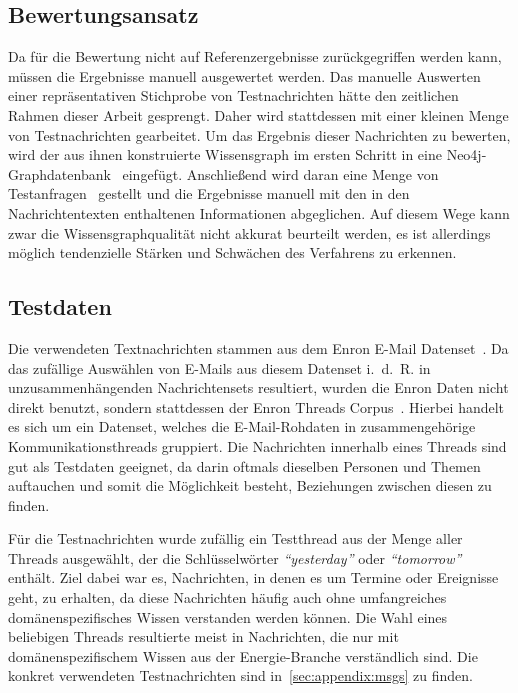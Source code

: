\subsection{Bewertungsansatz}%
\label{sec:evaluation:quality:method}

Da für die Bewertung nicht auf Referenzergebnisse zurückgegriffen werden kann, müssen die Ergebnisse manuell ausgewertet werden.
Das manuelle Auswerten einer repräsentativen Stichprobe von Testnachrichten hätte den zeitlichen Rahmen dieser Arbeit gesprengt.
Daher wird stattdessen mit einer kleinen Menge von Testnachrichten gearbeitet.
Um das Ergebnis dieser Nachrichten zu bewerten, wird der aus ihnen konstruierte Wissensgraph im ersten Schritt in eine Neo4j-Graphdatenbank~\cite{Neo4j} eingefügt.
Anschließend wird daran eine Menge von Testanfragen~ gestellt und die Ergebnisse manuell mit den in den Nachrichtentexten enthaltenen Informationen abgeglichen.
Auf diesem Wege kann zwar die Wissensgraphqualität nicht akkurat beurteilt werden, es ist allerdings möglich tendenzielle Stärken und Schwächen des Verfahrens zu erkennen.

\subsection{Testdaten}%
\label{sec:evaluation:quality:data}

Die verwendeten Textnachrichten stammen aus dem Enron E-Mail Datenset~\cite{Cohen2015}.
Da das zufällige Auswählen von E-Mails aus diesem Datenset i.~d.~R. in unzusammenhängenden Nachrichtensets resultiert, wurden die Enron Daten nicht direkt benutzt, sondern stattdessen der Enron Threads Corpus~\cite{Jamison2013}\cite{EnronThreads}.
Hierbei handelt es sich um ein Datenset, welches die E-Mail-Rohdaten in zusammengehörige Kommunikationsthreads gruppiert.
Die Nachrichten innerhalb eines Threads sind gut als Testdaten geeignet, da darin oftmals dieselben Personen und Themen auftauchen und somit die Möglichkeit besteht, Beziehungen zwischen diesen zu finden.

Für die Testnachrichten wurde zufällig ein Testthread aus der Menge aller Threads ausgewählt, der die Schlüsselwörter \textit{``yesterday''} oder \textit{``tomorrow''} enthält.
Ziel dabei war es, Nachrichten, in denen es um Termine oder Ereignisse geht, zu erhalten, da diese Nachrichten häufig auch ohne umfangreiches domänenspezifisches Wissen verstanden werden können.
Die Wahl eines beliebigen Threads resultierte meist in Nachrichten, die nur mit domänenspezifischem Wissen aus der Energie-Branche verständlich sind.
Die konkret verwendeten Testnachrichten sind in~\ref{sec:appendix:msgs} zu finden.

